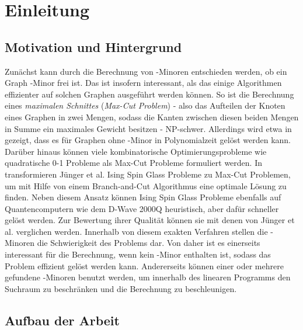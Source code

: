 \chapter{Einleitung}
\label{cha:einleitung}

\section{Motivation und Hintergrund}
\label{sec:motivation_und_hintergrund}
Zunächst kann durch die Berechnung von \kf-Minoren entschieden werden, ob ein Graph \kf-Minor frei ist.
Das ist insofern interessant, als das einige Algorithmen effizienter auf solchen Graphen ausgeführt werden können.
So ist die Berechnung eines \textit{maximalen Schnittes} (\textit{Max-Cut Problem}) - also das Aufteilen der Knoten eines Graphen in zwei Mengen, sodass die Kanten zwischen diesen beiden Mengen in Summe ein maximales Gewicht besitzen - NP-schwer\cite{Kar72}.
Allerdings wird etwa in \cite{Bar83} gezeigt, dass es für Graphen ohne \kf-Minor in Polynomialzeit gelöst werden kann.
Darüber hinaus können viele kombinatorische Optimierungsprobleme wie quadratische 0-1 Probleme als Max-Cut Probleme formuliert werden\cite{BJR89}.
In \cite{JLMR+19} transformieren Jünger et al.\nolinebreak[4]\@\xspace Ising Spin Glass Probleme zu Max-Cut Problemen, um mit Hilfe von einem Branch-and-Cut Algorithmus eine optimale Lösung zu finden.
Neben diesem Ansatz können Ising Spin Glass Probleme ebenfalls auf Quantencomputern wie dem D-Wave 2000Q heuristisch, aber dafür schneller gelöst werden.
Zur Bewertung ihrer Qualität können sie mit denen von Jünger et al.\nolinebreak[4]\@\xspace verglichen werden.
Innerhalb von diesem exakten Verfahren stellen die \kf-Minoren die Schwierigkeit des Problems dar.
Von daher ist es einerseits interessant für die Berechnung, wenn kein \kf-Minor enthalten ist, sodass das Problem effizient gelöst werden kann.
Andererseits können einer oder mehrere gefundene \kf-Minoren benutzt werden, um innerhalb des linearen Programms den Suchraum zu beschränken und die Berechnung zu beschleunigen.

\section{Aufbau der Arbeit}
\label{sec:aufbau}
